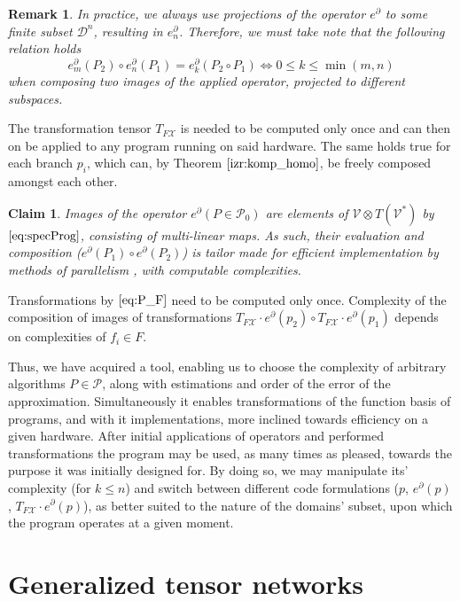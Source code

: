 \documentclass[preprint,12pt]{elsarticle}
\newcommand{\VV}{\mathcal{V}}
\newcommand{\X}{\mathcal{X}}
\newcommand{\dP}{\mathcal{P}}
\newcommand{\D}{\partial}
\newcommand{\DD}{\mathcal{D}}
\newtheorem{trditev}{Claim}[section]
\newtheorem{opomba}{Remark}[section]
\begin{document}
\begin{opomba}
In practice, we always use projections of the operator $e^\D$ to some finite subset $\DD^n$, resulting in $e^\D_n$. Therefore, we must take note that the following relation holds
\begin{equation}
e^\D_m(P_2)\circ e^\D_n(P_1)=e^\D_k(P_2\circ P_1)\iff 0\le k\le \min(m,n)
\end{equation}
when composing two images of the applied operator, projected to different subspaces.
\end{opomba}

The transformation tensor $T_{F\X}$ is needed to be computed only once and can then on be applied to any program running on said hardware. The same holds true for each branch $p_i$, which can, by Theorem $\ref{izr:komp_homo}$, be freely composed amongst each other.

\begin{trditev}\label{clm:paralel}
Images of the operator $e^\D (P\in\dP_0)$ are elements of $\VV\otimes T(\VV^*)$ by $\eqref{eq:specProg}$, consisting of multi-linear maps. As such, their evaluation and composition ($e^\D(P_1)\circ e^\D(P_2)$) is tailor made for efficient implementation by methods of parallelism \cite{TensorGPU}, with computable complexities.
\end{trditev}

Transformations by $\eqref{eq:P_F}$ need to be computed only once. Complexity of the composition of images of transformations $T_{F\X}\cdot e^\D(p_2)\circ T_{F\X}\cdot e^\D(p_1)$ depends on complexities of $f_i\in F$.

Thus, we have acquired a tool, enabling us to choose the complexity of arbitrary algorithms $P\in\dP$, along with estimations and order of the error of the approximation. Simultaneously it enables transformations of the function basis of programs, and with it implementations, more inclined towards efficiency on a given hardware. After initial applications of operators and performed transformations the program may be used, as many times as pleased, towards the purpose it was initially designed for. By doing so, we may manipulate its' complexity (for $k\le n$) and switch between different code formulations ($p$, $e^\D(p)$, $T_{F\X}\cdot e^\D(p)$), as better suited to the nature of the domains' subset, upon which the program operates at a given moment.

\section{Generalized tensor networks}\label{sec:generalTensorNet}
\end{document}
